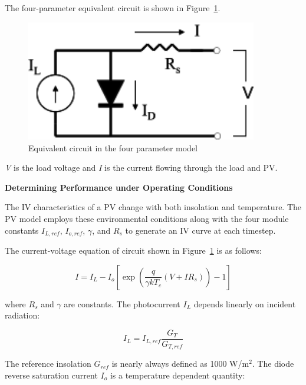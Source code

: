 The four-parameter equivalent circuit is shown in Figure~\ref{fig:equivalent-circuit-in-the-four-parameter}.

\begin{figure}[hbtp] %
\centering
\includegraphics[width=0.9\textwidth, height=0.9\textheight, keepaspectratio=true]{media/image7592.svg.png}
\caption{Equivalent circuit in the four parameter model \protect \label{fig:equivalent-circuit-in-the-four-parameter}}
\end{figure}

\emph{V} is the load voltage and \emph{I} is the current flowing through the load and PV.

\textbf{Determining Performance under Operating Conditions}

The IV characteristics of a PV change with both insolation and temperature. The PV model employs these environmental conditions along with the four module constants \(I_{L,ref}\), \(I_{o,ref}\), \(\gamma\), and \(R_{s}\) to generate an IV curve at each timestep.

The current-voltage equation of circuit shown in Figure~\ref{fig:equivalent-circuit-in-the-four-parameter} is as follows:

\begin{equation}
I = {I_L} - {I_o}\left[ {\exp \left( {\frac{q}{{\gamma k{T_c}}}\left( {V + I{R_s}} \right)} \right) - 1} \right]
\label{eq:ElecLoadI869}
\end{equation}

where \(R_{s}\) and \(\gamma\) are constants. The photocurrent \(I_{L}\) depends linearly on incident radiation:

\begin{equation}
{I_L} = {I_{L,ref}}\frac{{{G_T}}}{{{G_{T,ref}}}}
\label{eq:ElecLoadIL870}
\end{equation}

The reference insolation \(G_{ref}\) is nearly always defined as 1000 W/m\(^{2}\). The diode reverse saturation current \(I_{o}\) is a temperature dependent quantity:

